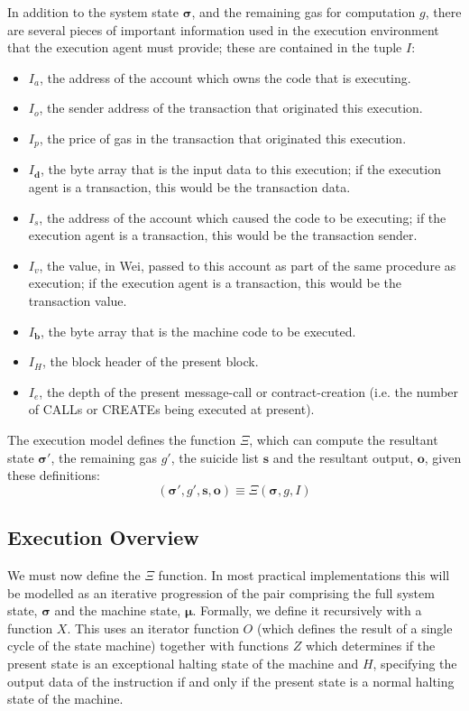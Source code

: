 \documentclass[9pt,oneside]{amsart}
\begin{document}
\begin{multicols}{2}
In addition to the system state $\boldsymbol{\sigma}$, and the remaining gas for computation $g$, there are several pieces of important information used in the execution environment that the execution agent must provide; these are contained in the tuple $I$:

\begin{itemize}
\item $I_a$, the address of the account which owns the code that is executing.
\item $I_o$, the sender address of the transaction that originated this execution.
\item $I_p$, the price of gas in the transaction that originated this execution.
\item $I_\mathbf{d}$, the byte array that is the input data to this execution; if the execution agent is a transaction, this would be the transaction data.
\item $I_s$, the address of the account which caused the code to be executing; if the execution agent is a transaction, this would be the transaction sender.
\item $I_v$, the value, in Wei, passed to this account as part of the same procedure as execution; if the execution agent is a transaction, this would be the transaction value.
\item $I_\mathbf{b}$, the byte array that is the machine code to be executed.
\item $I_H$, the block header of the present block.
\item $I_e$, the depth of the present message-call or contract-creation (i.e. the number of {\small CALL}s or {\small CREATE}s being executed at present).
\end{itemize}

The execution model defines the function $\Xi$, which can compute the resultant state $\boldsymbol{\sigma}'$, the remaining gas $g'$, the suicide list $\mathbf{s}$ and the resultant output, $\mathbf{o}$, given these definitions:
\begin{equation}
(\boldsymbol{\sigma}', g', \mathbf{s}, \mathbf{o}) \equiv \Xi(\boldsymbol{\sigma}, g, I)
\end{equation}

\subsection{Execution Overview}

We must now define the $\Xi$ function. In most practical implementations this will be modelled as an iterative progression of the pair comprising the full system state, $\boldsymbol{\sigma}$ and the machine state, $\boldsymbol{\mu}$. Formally, we define it recursively with a function $X$. This uses an iterator function $O$ (which defines the result of a single cycle of the state machine) together with functions $Z$ which determines if the present state is an exceptional halting state of the machine and $H$, specifying the output data of the instruction if and only if the present state is a normal halting state of the machine.


\end{multicols}
\end{document}
